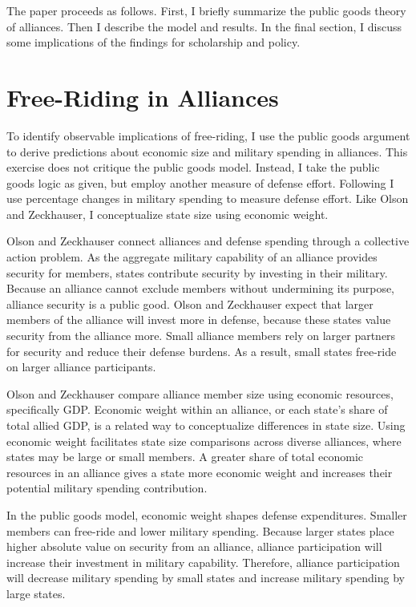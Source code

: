 \documentclass[12pt]{article}
\begin{document}
The paper proceeds as follows.
First, I briefly summarize the public goods theory of alliances.
Then I describe the model and results. 
In the final section, I discuss some implications of the findings for scholarship and policy. 



\section{Free-Riding in Alliances}

To identify observable implications of free-riding, I use the public goods argument to derive predictions about economic size and military spending in alliances.
This exercise does not critique the public goods model.
Instead, I take the public goods logic as given, but employ another measure of defense effort. 
Following \citet{PluemperNeumayer2015} I use percentage changes in military spending to measure defense effort.
Like Olson and Zeckhauser, I conceptualize state size using economic weight. 

Olson and Zeckhauser connect alliances and defense spending through a collective action problem. 
As the aggregate military capability of an alliance provides security for members, states contribute security by investing in their military.
Because an alliance cannot exclude members without undermining its purpose, alliance security is a public good. 
Olson and Zeckhauser expect that larger members of the alliance will invest more in defense, because these states value security from the alliance more.
Small alliance members rely on larger partners for security and reduce their defense burdens.
As a result, small states free-ride on larger alliance participants. 


Olson and Zeckhauser compare alliance member size using economic resources, specifically GDP.
Economic weight within an alliance, or each state's share of total allied GDP, is a related way to conceptualize differences in state size.
Using economic weight facilitates state size comparisons across diverse alliances, where states may be large or small members. 
A greater share of total economic resources in an alliance gives a state more economic weight and increases their potential military spending contribution. 


In the public goods model, economic weight shapes defense expenditures. 
Smaller members can free-ride and lower military spending. 
Because larger states place higher absolute value on security from an alliance, alliance participation will increase their investment in military capability. 
Therefore, alliance participation will decrease military spending by small states and increase military spending by large states. 
\end{document}
